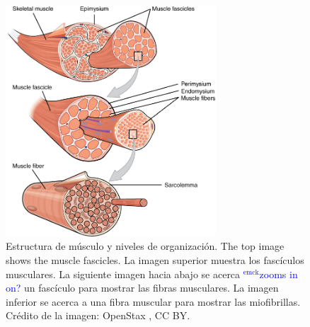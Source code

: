 \documentclass[12pt]{article}
\newcommand{\emck}[1]{\textcolor{blue}{$^{\textrm{emck}}${#1}}}
\begin{document}
\begin{figure}[h!]
\centering
\includegraphics[width=0.7\textwidth]{figures/muscleStructure.jpg}
\caption{Estructura de músculo y niveles de organización. The top
  image shows the muscle fascicles. La imagen superior muestra los
  fascículos musculares. La siguiente imagen hacia abajo se acerca
  \emck{zooms in on?} un fascículo para mostrar las fibras
  musculares. La imagen inferior se acerca a una fibra muscular
  para mostrar las miofibrillas. Crédito de la imagen: OpenStax
  \cite{openStax2016muscle}, CC BY.}
\label{fig:fibers}
\end{figure}

\vspace{0.2cm}
\end{document}
